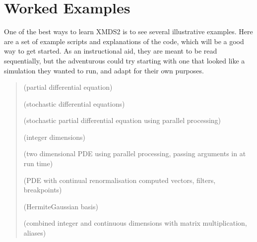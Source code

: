 \documentclass[letterpaper,10pt,english]{sphinxmanual}
\begin{document}
\chapter{Worked Examples}
\label{\detokenize{worked_examples:worked-examples}}\label{\detokenize{worked_examples:workedexamples}}\label{\detokenize{worked_examples:index-0}}\label{\detokenize{worked_examples::doc}}
\sphinxAtStartPar
One of the best ways to learn XMDS2 is to see several illustrative examples.  Here are a set of example scripts and explanations of the code, which will be a good way to get started.  As an instructional aid, they are meant to be read sequentially, but the adventurous could try starting with one that looked like a simulation they wanted to run, and adapt for their own purposes.
\begin{quote}

\sphinxAtStartPar
{\hyperref[\detokenize{worked_examples:nonlinearschrodingerequation}]{}} (partial differential equation)

\sphinxAtStartPar
{\hyperref[\detokenize{worked_examples:kubo}]{}} (stochastic differential equations)

\sphinxAtStartPar
{\hyperref[\detokenize{worked_examples:fibre}]{}} (stochastic partial differential equation using parallel processing)

\sphinxAtStartPar
{\hyperref[\detokenize{worked_examples:integerdimensionexample}]{}} (integer dimensions)

\sphinxAtStartPar
{\hyperref[\detokenize{worked_examples:wignerarguments}]{}} (two dimensional PDE using parallel processing, passing arguments in at run time)

\sphinxAtStartPar
{\hyperref[\detokenize{worked_examples:groundstatebec}]{}} (PDE with continual renormalisation \sphinxhyphen{} computed vectors, filters, breakpoints)

\sphinxAtStartPar
{\hyperref[\detokenize{worked_examples:hermitegaussgroundstatebec}]{}} (Hermite\sphinxhyphen{}Gaussian basis)

\sphinxAtStartPar
{\hyperref[\detokenize{worked_examples:dmultistatese}]{}} (combined integer and continuous dimensions with matrix multiplication, aliases)
\end{quote}
\end{document}
